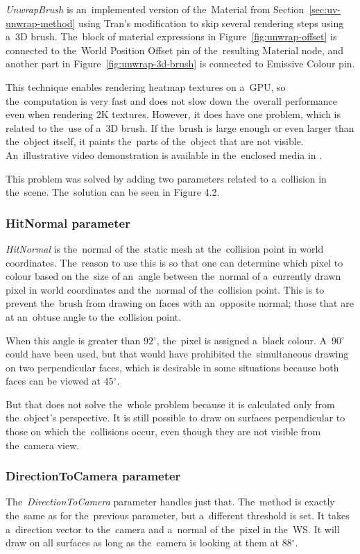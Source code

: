 \emph{UnwrapBrush} is an~implemented version of the~Material from Section~\ref{sec:uv-unwrap-method} using Tran's modification to skip several rendering steps using a~3D brush. The~block of material expressions in Figure~\ref{fig:unwrap-offset} is connected to the~World Position Offset pin of the~resulting Material node, and another part in Figure~\ref{fig:unwrap-3d-brush} is connected to Emissive Colour pin.

This technique enables rendering heatmap textures on a~GPU, so the~computation is very fast and does not slow down the~overall performance even when rendering 2K textures. However, it does have one problem, which is related to the~use of a~3D brush. If the~brush is large enough or even larger than the~object itself, it paints the~parts of the~object that are not visible. An~illustrative video demonstration is available in the~enclosed media in .

This problem was solved by adding two parameters related to a~collision in the~scene. The~solution can be seen in Figure 4.2.

\subsubsection*{HitNormal parameter}
\emph{HitNormal} is the~normal of the~static mesh at the~collision point in world coordinates. The~reason to use this is so that one can determine which pixel to colour based on the~size of an~angle between the~normal of a~currently drawn pixel in world coordinates and the~normal of the~collision point. This is to prevent the~brush from drawing on faces with an~opposite normal; those that are at an~obtuse angle to the~collision point.

When this angle is greater than $92{^\circ}$, the~pixel is assigned a~black colour. A~$90{^\circ}$ could have been used, but that would have prohibited the~simultaneous drawing on two perpendicular faces, which is desirable in some situations because both faces can be viewed at $45{^\circ}$.

But that does not solve the~whole problem because it is calculated only from the~object's perspective. It is still possible to draw on surfaces perpendicular to those on which the~collisions occur, even though they are not visible from the~camera view. 

\subsubsection*{DirectionToCamera parameter}
The~\emph{DirectionToCamera} parameter handles just that. The~method is exactly the~same as for the~previous parameter, but a~different threshold is set. It takes a~direction vector to the~camera and a~normal of the~pixel in the~WS. It will draw on all surfaces as long as the~camera is looking at them at $88{^\circ}$.

